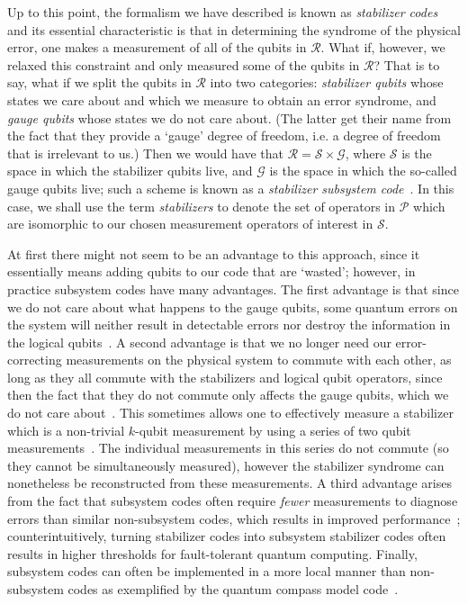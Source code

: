 \documentclass{amsbook}
\theoremstyle{plain}
\theoremstyle{definition}
\theoremstyle{remark}
\begin{document}
Up to this point, the formalism we have described is known as \emph{stabilizer codes}~\cite{Gottesman:96a,Gottesman:97a,Calderbank:97a,Calderbank:97b} and its essential characteristic is that in determining the syndrome of the physical error, one makes a measurement of all of the qubits in $\mathscr{R}$. What if, however, we relaxed this constraint and only measured some of the qubits in $\mathscr{R}$?  That is to say, what if we split the qubits in $\mathscr{R}$ into two categories: \emph{stabilizer
qubits} whose states we care about and which we measure to obtain an error syndrome, and \emph{gauge
qubits} whose states we do not care about.  (The latter get their name
from the fact that they provide a `gauge' degree of freedom, i.e. a
degree of freedom that is irrelevant to us.)  Then we would have that
$\mathscr{R}=\mathscr{S}\times \mathscr{G}$, where $\mathscr{S}$ is
the space in which the stabilizer qubits live, and $\mathscr{G}$ is
the space in which the so-called gauge qubits live; such a scheme is
known as a \emph{stabilizer subsystem code}~\cite{Poulin:05a}.  In this case, we shall use the term
\emph{stabilizers} to denote the set of operators in $\mathscr{P}$ which are isomorphic to our chosen measurement operators of interest in $\mathscr{S}$.

At first there might not seem to be an advantage to this approach, since it essentially means adding qubits to our code that are
`wasted'; however, in practice subsystem codes have many advantages.  The first advantage is that since we do not care about what happens to the gauge qubits, some quantum errors on the system will neither result in detectable errors nor destroy the information in the logical qubits~\cite{Poulin:05a,Kribs:05a,Kribs:05b,Nielsen:05a,Kribs:06a,Bacon:06a}.  A second advantage is that we no longer need our error-correcting measurements on the physical system to commute with each other, as long as they all commute with the stabilizers and logical qubit operators, since then the fact that they do not commute only affects the gauge qubits, which we do not care about~\cite{Aliferis:07a}.  This sometimes allows one to effectively measure a stabilizer which is a non-trivial $k$-qubit measurement by using a series of two qubit measurements~\cite{Aliferis:07a}.  The individual measurements in this series do not commute (so they cannot be simultaneously measured), however the stabilizer syndrome can nonetheless be reconstructed from these measurements.  A third advantage arises from the fact that subsystem codes often require {\em fewer} measurements to diagnose errors than similar non-subsystem codes, which results in improved performance~\cite{Aliferis:07a,Cross:07a};  counterintuitively, turning stabilizer codes into subsystem stabilizer codes often results in higher thresholds for fault-tolerant quantum computing.  Finally, subsystem codes can often be implemented in a more local manner than non-subsystem codes as exemplified by the quantum compass model code~\cite{Bacon:06a,Aliferis:07a}.
\end{document}
